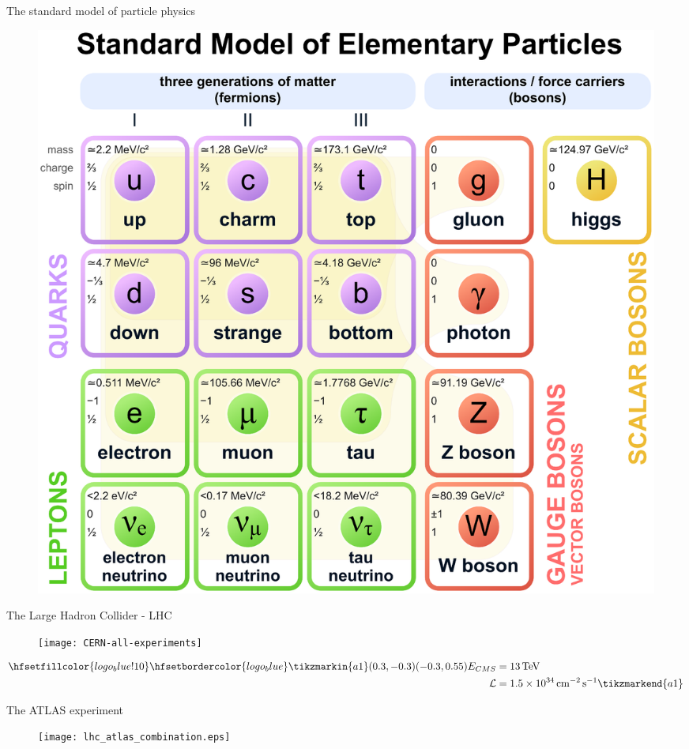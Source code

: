 \begin{frame}{The standard model of particle physics}
\begin{figure}
    \centering
    \includegraphics[scale=0.17]{Standard_Model_of_Elementary_Particles.eps}
    \caption{\cite{standard_model}}
    \label{fig:my_label}
\end{figure}
\end{frame}

\begin{frame}{The Large Hadron Collider - LHC}
    \begin{figure}
        \centering
        \texttt{[image: CERN-all-experiments]}
        \caption{\cite{Pequenao:1095924}}
        \label{fig:my_label}
    \end{figure}
     \begin{align*}
        \hfsetfillcolor{logo_blue!10}
        \hfsetbordercolor{logo_blue}
        \tikzmarkin{a1}(0.3,-0.3)(-0.3,0.55)
        E_{CMS} &= \SI{13}{\tera \electronvolt}\\ 
        \mathcal{L} &= \SI{1.5e34}{\per \square \centi \metre  \per \second} 
        \tikzmarkend{a1}
    \end{align*}
\end{frame}

\begin{frame}{The ATLAS experiment}
    \begin{figure}
        \centering
        \texttt{[image: lhc\_atlas\_combination.eps]}
        \caption{\cite{Pequenao:1095924}}
        \label{fig:my_label}
    \end{figure}
\end{frame}

